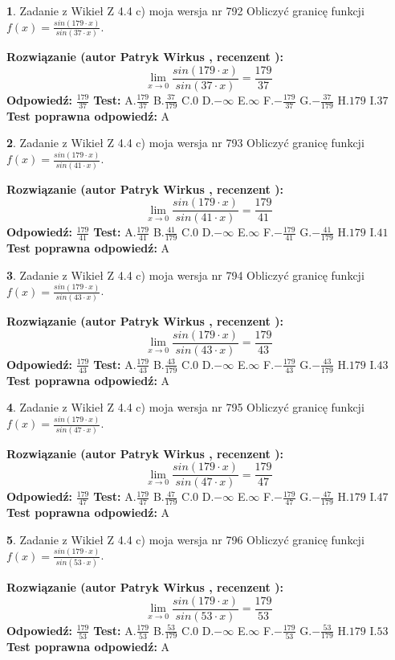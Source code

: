 \documentclass[12pt, a4paper]{article}
\theoremstyle{definition} %
\newtheorem{zad}{}
\newcommand{\zadStart}[1]{\begin{zad}#1\newline}
\newcommand{\zadStop}{\end{zad}}
\newcommand{\rozwStart}[2]{\noindent \textbf{Rozwiązanie (autor #1 , recenzent #2): }\newline}
\newcommand{\rozwStop}{\newline}
\newcommand{\odpStart}{\noindent \textbf{Odpowiedź:}\newline}
\newcommand{\odpStop}{\newline}
\newcommand{\testStart}{\noindent \textbf{Test:}\newline}
\newcommand{\testStop}{\newline}
\newcommand{\kluczStart}{\noindent \textbf{Test poprawna odpowiedź:}\newline}
\newcommand{\kluczStop}{\newline}
\begin{document}
\zadStart{Zadanie z Wikieł Z 4.4 c) moja wersja nr 792}
Obliczyć granicę funkcji $f(x)=\frac{sin(179\cdot x)}{sin(37\cdot x)}$.
\zadStop
\rozwStart{Patryk Wirkus}{}
$$\lim\limits_{x\to 0}\frac{sin(179\cdot x)}{sin(37\cdot x)}=
\frac{179}{37}$$
\rozwStop
\odpStart
$\frac{179}{37}$
\odpStop
\testStart
A.$\frac{179}{37}$
B.$\frac{37}{179}$
C.$0$
D.$-\infty$
E.$\infty$
F.$-\frac{179}{37}$
G.$-\frac{37}{179}$
H.$179$
I.$37$
\testStop
\kluczStart
A
\kluczStop



\zadStart{Zadanie z Wikieł Z 4.4 c) moja wersja nr 793}
Obliczyć granicę funkcji $f(x)=\frac{sin(179\cdot x)}{sin(41\cdot x)}$.
\zadStop
\rozwStart{Patryk Wirkus}{}
$$\lim\limits_{x\to 0}\frac{sin(179\cdot x)}{sin(41\cdot x)}=
\frac{179}{41}$$
\rozwStop
\odpStart
$\frac{179}{41}$
\odpStop
\testStart
A.$\frac{179}{41}$
B.$\frac{41}{179}$
C.$0$
D.$-\infty$
E.$\infty$
F.$-\frac{179}{41}$
G.$-\frac{41}{179}$
H.$179$
I.$41$
\testStop
\kluczStart
A
\kluczStop



\zadStart{Zadanie z Wikieł Z 4.4 c) moja wersja nr 794}
Obliczyć granicę funkcji $f(x)=\frac{sin(179\cdot x)}{sin(43\cdot x)}$.
\zadStop
\rozwStart{Patryk Wirkus}{}
$$\lim\limits_{x\to 0}\frac{sin(179\cdot x)}{sin(43\cdot x)}=
\frac{179}{43}$$
\rozwStop
\odpStart
$\frac{179}{43}$
\odpStop
\testStart
A.$\frac{179}{43}$
B.$\frac{43}{179}$
C.$0$
D.$-\infty$
E.$\infty$
F.$-\frac{179}{43}$
G.$-\frac{43}{179}$
H.$179$
I.$43$
\testStop
\kluczStart
A
\kluczStop



\zadStart{Zadanie z Wikieł Z 4.4 c) moja wersja nr 795}
Obliczyć granicę funkcji $f(x)=\frac{sin(179\cdot x)}{sin(47\cdot x)}$.
\zadStop
\rozwStart{Patryk Wirkus}{}
$$\lim\limits_{x\to 0}\frac{sin(179\cdot x)}{sin(47\cdot x)}=
\frac{179}{47}$$
\rozwStop
\odpStart
$\frac{179}{47}$
\odpStop
\testStart
A.$\frac{179}{47}$
B.$\frac{47}{179}$
C.$0$
D.$-\infty$
E.$\infty$
F.$-\frac{179}{47}$
G.$-\frac{47}{179}$
H.$179$
I.$47$
\testStop
\kluczStart
A
\kluczStop



\zadStart{Zadanie z Wikieł Z 4.4 c) moja wersja nr 796}
Obliczyć granicę funkcji $f(x)=\frac{sin(179\cdot x)}{sin(53\cdot x)}$.
\zadStop
\rozwStart{Patryk Wirkus}{}
$$\lim\limits_{x\to 0}\frac{sin(179\cdot x)}{sin(53\cdot x)}=
\frac{179}{53}$$
\rozwStop
\odpStart
$\frac{179}{53}$
\odpStop
\testStart
A.$\frac{179}{53}$
B.$\frac{53}{179}$
C.$0$
D.$-\infty$
E.$\infty$
F.$-\frac{179}{53}$
G.$-\frac{53}{179}$
H.$179$
I.$53$
\testStop
\kluczStart
A
\kluczStop
\end{document}

